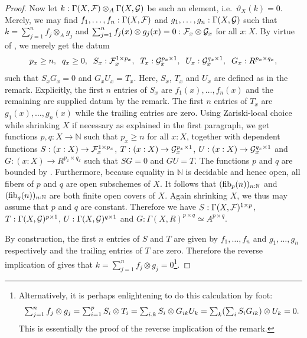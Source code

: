 \begin{proof}
  Now let $k:\Gamma(X,\mathcal{F}) \otimes_A \Gamma(X,\mathcal{G})$ be such an element, i.e.\ $\vartheta_X(k)=0$.
  Merely, we may find $f_1,\hdots,f_n : \Gamma(X,\mathcal{F})$ and $g_1,\hdots,g_n : \Gamma(X,\mathcal{G})$ such that $k = \sum_{j=1}^n f_j \otimes_A g_j$ and $\sum_{j=1}^n f_j(x) \otimes g_j(x) = 0  : \mathcal{F}_x \otimes \mathcal{G}_x$ for all $x:X$.
  By virtue of , we merely get the datum
  \[
    p_x \geq n, \;\;
    q_x \geq 0, \;\;
    S_x : \mathcal{F}_x^{1 \times p_x}, \;\;
    T_x : \mathcal{G}_x^{p_x \times 1}, \;\;
    U_x : \mathcal{G}_x^{q_x \times 1}, \;\;
    G_x : R^{p_x \times q_x},
  \]
  such that $S_xG_x = 0$ and $G_xU_x = T_x$. Here, $S_x$, $T_x$ and $U_x$ are defined as in the remark.
  Explicitly, the first $n$ entries of $S_x$ are $f_1(x), \hdots, f_n(x)$  and the remaining are supplied datum by the remark.
  The first $n$ entries of $T_x$ are $g_1(x), \hdots, g_n(x)$ while the trailing entries are zero.
  Using Zariski-local choice while shrinking $X$ if necessary as explained in the first paragraph, we get functions $p,q : X \to \mathbb N$ such that $p_x \geq n$ for all $x:X$, together with dependent functions $S : (x:X) \to \mathcal{F}_x^{1 \times p_x}$, $T : (x:X) \to \mathcal{G}_x^{p_x \times 1}$, $U : (x:X) \to \mathcal{G}_x^{q_x \times 1}$ and $G : (x:X) \to R^{p_x \times q_x}$ such that $SG = 0$ and $GU = T$.
  The functions $p$ and $q$ are bounded by \cite[Theorem 3.3.3]{draft}.
  Furthermore, because equality in $\mathbb N$ is decidable and hence open, all fibers of $p$ and $q$ are open subschemes of $X$.
  It follows that $(\mathrm{fib}_p(n))_{n:\mathbb N}$ and $(\mathrm{fib}_q(n))_{n:\mathbb N}$ are both finite open covers of $X$.
  Again shrinking $X$, we thus may assume that $p$ and $q$ are constant.
  Therefore we have $S : \Gamma(X,\mathcal{F})^{1 \times p}$, $T : \Gamma(X,\mathcal{G})^{p \times 1}$, $U : \Gamma(X,\mathcal{G})^{q \times 1}$ and $G : \Gamma(X, R)^{p \times q} \simeq A^{p \times q}$.

  By construction, the first $n$ entries of $S$ and $T$ are given by $f_1, \hdots, f_n$ and $g_1, \hdots, g_n$ respectively and the trailing entries of $T$ are zero.
  Therefore the reverse implication of  gives that $k = \sum_{j=1}^n f_j \otimes g_j = 0$\footnote{
    Alternatively, it is perhaps enlightening to do this calculation by foot:
    \[
      \textstyle
      \sum_{j=1}^n f_j \otimes g_j = \sum_{i=1}^p S_i \otimes T_i = \sum_{i,k} S_i \otimes G_{ik}U_k = \sum_k(\sum_i S_iG_{ik}) \otimes U_k = 0 \rlap{.}
    \]
    This is essentially the proof of the reverse implication of the remark.
  }.


\end{proof}
